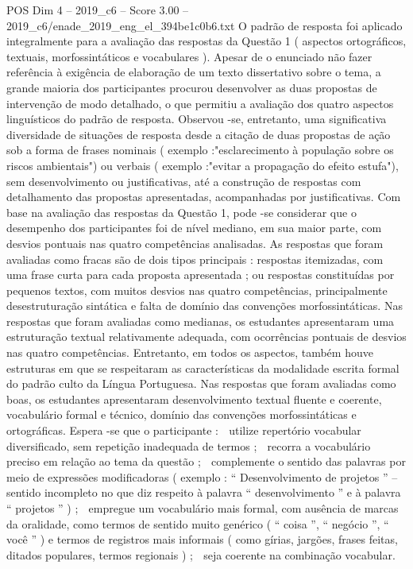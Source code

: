 \begin{textsample}{POS Dim 4 – 2019\_c6 – Score 3.00 – 2019\_c6/enade\_2019\_eng\_el\_394be1c0b6.txt}
O padrão de resposta foi aplicado integralmente para a avaliação das respostas da Questão 1 ( aspectos ortográficos, textuais, morfossintáticos e vocabulares ).
Apesar de o enunciado não fazer referência à exigência de elaboração de um texto dissertativo sobre o tema, a grande maioria dos participantes procurou desenvolver as duas propostas de intervenção de modo detalhado, o que permitiu a avaliação dos quatro aspectos linguísticos do padrão de resposta.
Observou -se, entretanto, uma significativa diversidade de situações de resposta desde a citação de duas propostas de ação sob a forma de frases nominais ( exemplo :"esclarecimento à população sobre os riscos ambientais") ou verbais ( exemplo :"evitar a propagação do efeito estufa"), sem desenvolvimento ou justificativas, até a construção de respostas com detalhamento das propostas apresentadas, acompanhadas por justificativas.
Com base na avaliação das respostas da Questão 1, pode -se considerar que o desempenho dos participantes foi de nível mediano, em sua maior parte, com desvios pontuais nas quatro competências analisadas.
As respostas que foram avaliadas como fracas são de dois tipos principais : respostas itemizadas, com uma frase curta para cada proposta apresentada ; ou respostas constituídas por pequenos textos, com muitos desvios nas quatro competências, principalmente desestruturação sintática e falta de domínio das convenções morfossintáticas.
Nas respostas que foram avaliadas como medianas, os estudantes apresentaram uma estruturação textual relativamente adequada, com ocorrências pontuais de desvios nas quatro competências.
Entretanto, em todos os aspectos, também houve estruturas em que se respeitaram as características da modalidade escrita formal do padrão culto da Língua Portuguesa.
Nas respostas que foram avaliadas como boas, os estudantes apresentaram desenvolvimento textual fluente e coerente, vocabulário formal e técnico, domínio das convenções morfossintáticas e ortográficas.
Espera -se que o participante :  utilize repertório vocabular diversificado, sem repetição inadequada de termos ;  recorra a vocabulário preciso em relação ao tema da questão ;  complemente o sentido das palavras por meio de expressões modificadoras ( exemplo : “ Desenvolvimento de projetos ” – sentido incompleto no que diz respeito à palavra “ desenvolvimento ” e à palavra “ projetos ” ) ;  empregue um vocabulário mais formal, com ausência de marcas da oralidade, como termos de sentido muito genérico ( “ coisa ”, “ negócio ”, “ você ” ) e termos de registros mais informais ( como gírias, jargões, frases feitas, ditados populares, termos regionais ) ;  seja coerente na combinação vocabular.

\end{textsample}
